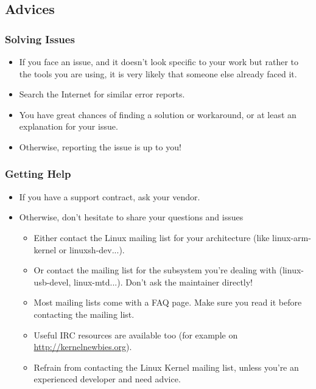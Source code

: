 \subsection{Advices}

\begin{frame}
  \frametitle{Solving Issues}
  \begin{itemize}
  \item If you face an issue, and it doesn't look specific to your
    work but rather to the tools you are using, it is very likely that
    someone else already faced it.
  \item Search the Internet for similar error reports.
  \item You have great chances of finding a solution or workaround, or
    at least an explanation for your issue.
  \item Otherwise, reporting the issue is up to you!
  \end{itemize}
\end{frame}

\begin{frame}
  \frametitle{Getting Help}
  \begin{itemize}
  \item If you have a support contract, ask your vendor.
  \item Otherwise, don't hesitate to share your questions and issues
    \begin{itemize}
    \item Either contact the Linux mailing list for your architecture
      (like linux-arm-kernel or linuxsh-dev...).
    \item Or contact the mailing list for the subsystem you're dealing
      with (linux- usb-devel, linux-mtd...). Don't ask the maintainer
      directly!
    \item Most mailing lists come with a FAQ page. Make sure you read
      it before contacting the mailing list.
    \item Useful IRC resources are available too
      (for example on \url{http://kernelnewbies.org}).
    \item Refrain from contacting the Linux Kernel mailing list,
      unless you're an experienced developer and need advice.
    \end{itemize}
  \end{itemize}
\end{frame}

